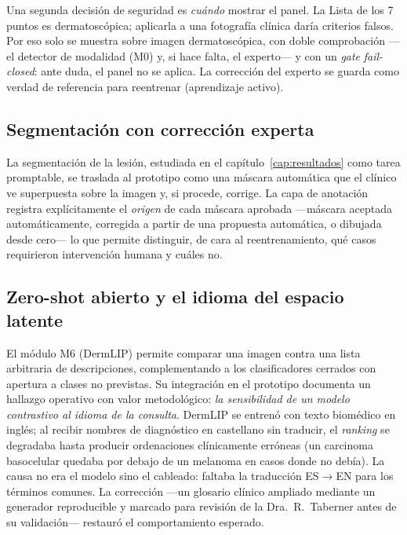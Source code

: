 Una segunda decisión de seguridad es \emph{cuándo} mostrar el panel. La
Lista de los 7 puntos es dermatoscópica; aplicarla a una fotografía clínica
daría criterios falsos. Por eso solo se muestra sobre imagen
dermatoscópica, con doble comprobación ---el detector de modalidad (M0) y,
si hace falta, el experto--- y con un \emph{gate} \emph{fail-closed}: ante
duda, el panel no se aplica. La corrección del experto se guarda como
verdad de referencia para reentrenar (aprendizaje activo).

\subsection{Segmentación con corrección experta}
\label{sec:proto-seg}

La segmentación de la lesión, estudiada en el capítulo~\ref{cap:resultados}
como tarea promptable, se traslada al prototipo como una máscara
automática que el clínico ve superpuesta sobre la imagen y, si procede,
corrige. La capa de anotación registra explícitamente el \emph{origen} de
cada máscara aprobada ---máscara aceptada automáticamente, corregida a
partir de una propuesta automática, o dibujada desde cero--- lo que
permite distinguir, de cara al reentrenamiento, qué casos requirieron
intervención humana y cuáles no.

\subsection{Zero-shot abierto y el idioma del espacio latente}
\label{sec:proto-zeroshot}

El módulo M6 (DermLIP) permite comparar una imagen contra una lista
arbitraria de descripciones, complementando a los clasificadores cerrados
con apertura a clases no previstas. Su integración en el prototipo
documenta un hallazgo operativo con valor metodológico: \emph{la
sensibilidad de un modelo contrastivo al idioma de la consulta}. DermLIP
se entrenó con texto biomédico en inglés; al recibir nombres de
diagnóstico en castellano sin traducir, el \emph{ranking} se degradaba
hasta producir ordenaciones clínicamente erróneas (un carcinoma basocelular
quedaba por debajo de un melanoma en casos donde no debía). La causa no era
el modelo sino el cableado: faltaba la traducción ES$\to$EN para los
términos comunes. La corrección ---un glosario clínico ampliado mediante un
generador reproducible y marcado para revisión de la Dra.~R.~Taberner antes
de su validación--- restauró el comportamiento esperado.


